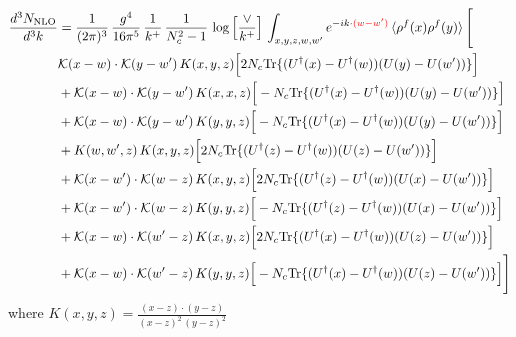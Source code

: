 \documentclass[9pt]{article}
\numberwithin{equation}{section}
\newcommand{\ph}[1]{{\color{red}#1}}
\begin{document}
\begin{align}
\frac{d^{3}N_{\mathrm{NLO}}}{d^{3}k} & = \frac{1}{(2\pi)^{3}}\,\frac{g^{4}}{16\pi^{5}}\,\frac{1}{k^{+}}\,\frac{1}{N^{2}_{c}-1}\,\log\Big[\frac{\vee}{k^{+}}\Big]\,\int_{x,y,z,w,w'}e^{-ik\cdot\ph{(w-w')}}\,\langle\rho^{f}(x)\rho^{f}(y) \rangle\,\Bigg[ \notag\\ & \mathcal K(x-w)\cdot\mathcal K(y-w')\,K(x,y,z)\Big[2 N_{c}{\rm Tr}\{(U^\dagger(x)-U^\dagger(w))(U(y)-U(w'))\}\Big]\notag\\
&+\mathcal K(x-w)\cdot\mathcal K(y-w')\,K(x,x,z)\Big[-N_{c}{\rm Tr}\{(U^\dagger(x)-U^\dagger(w))(U(y)-U(w'))\}\Big]\notag\\
&+\mathcal K(x-w)\cdot\mathcal K(y-w')\,K(y,y,z)\Big[-N_{c}{\rm Tr}\{(U^\dagger(x)-U^\dagger(w))(U(y)-U(w'))\}\Big]\notag\\
&+K(w,w',z)\,K(x,y,z)\Big[2 N_{c}{\rm Tr}\{(U^\dagger(z)-U^\dagger(w))(U(z)-U(w'))\}\Big]\notag\\
&+\mathcal K(x-w')\cdot\mathcal K(w-z)\,K(x,y,z)\Big[2 N_{c}{\rm Tr}\{(U^\dagger(z)-U^\dagger(w))(U(x)-U(w'))\}\Big]\notag\\
&+\mathcal K(x-w')\cdot\mathcal K(w-z)\,K(y,y,z)\Big[-N_{c}{\rm Tr}\{(U^\dagger(z)-U^\dagger(w))(U(x)-U(w'))\}\Big]\notag\\
&+\mathcal K(x-w)\cdot\mathcal K(w'-z)\,K(x,y,z)\Big[2 N_{c}{\rm Tr}\{(U^\dagger(x)-U^\dagger(w))(U(z)-U(w'))\}\Big]\notag\\
&+\mathcal K(x-w)\cdot\mathcal K(w'-z)\,K(y,y,z)\Big[-N_{c}{\rm Tr}\{(U^\dagger(x)-U^\dagger(w))(U(z)-U(w'))\}\Big]\Bigg]
\end{align}
where $K(x,y,z) = \frac{(x-z)\cdot (y-z)}{(x-z)^{2}\, (y-z)^{2}}$
\end{document}
